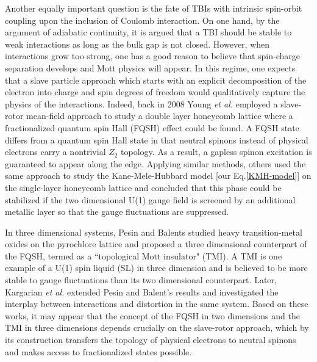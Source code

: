 \documentclass[aps,prb,twocolumn,superscriptaddress,showpacs]{revtex4-1}
\begin{document}
Another equally important question is the fate of TBIs with intrinsic spin-orbit coupling upon the inclusion of Coulomb interaction. On one hand, by the argument of adiabatic continuity, it is argued that a TBI should be stable to weak interactions as long as the bulk gap is not closed.\cite{Kane:2005a,Kane:2005b} However, when interactions grow too strong, one has a good reason to believe that spin-charge separation develops and Mott physics will appear.\cite{Pesin:np10} In this regime, one expects that a slave particle approach which starts with an explicit decomposition of the electron into charge and spin degrees of freedom would qualitatively capture the physics of the interactions. Indeed, back in 2008 Young \emph{et al.}\cite{Young:prb08} employed a slave-rotor mean-field approach to study a double layer honeycomb lattice where a fractionalized quantum spin Hall (FQSH) effect could be found. A FQSH state differs from a quantum spin Hall state in that neutral spinons instead of physical electrons carry a nontrivial $Z_2$ topology. As a result, a gapless spinon excitation is guaranteed to appear along the edge. Applying similar methods, others\cite{Rachel:prb10,Kou:prb11} used the same approach to study the Kane-Mele-Hubbard model [our Eq.\eqref{KMH-model}] on the single-layer honeycomb lattice and concluded that this phase could be stabilized if the two dimensional U(1) gauge field is screened by an additional metallic layer so that the gauge fluctuations are suppressed.

In three dimensional systems, Pesin and Balents\cite{Pesin:np10} studied heavy transition-metal oxides on the pyrochlore lattice and proposed a three dimensional counterpart of the FQSH, termed as a ``topological Mott insulator" (TMI).  A TMI is one example of a U(1) spin liquid (SL) in three dimension and is believed to be more stable to gauge fluctuations than its two dimensional counterpart.\cite{Witczak-Krempa:prb10} Later, Kargarian \emph{et al.}\cite{Kargarian:prb11} extended Pesin and Balent's results and investigated the interplay between interactions and distortion in the same system. Based on these works, it may appear that the concept of the FQSH in two dimensions and the TMI in three dimensions depends crucially on the slave-rotor approach, which by its construction transfers the topology of physical electrons to neutral spinons and makes access to fractionalized states possible.
\end{document}
